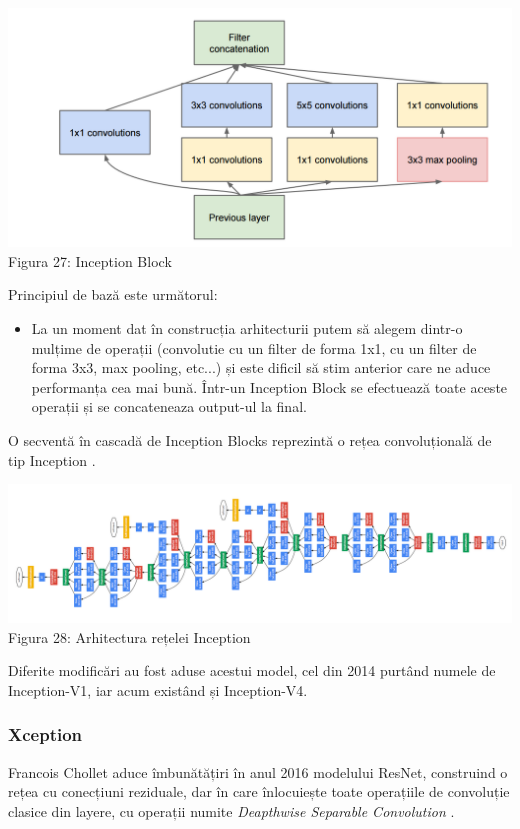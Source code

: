 \begin{center}
\includegraphics[scale=0.4]{inceptionBlock} \\
Figura 27: Inception Block
\end{center}

Principiul de bază este următorul:

\begin{itemize}
\item La un moment dat în construcția arhitecturii putem să alegem dintr-o mulțime de operații (convolutie cu un filter de forma 1x1, cu un filter de forma 3x3, max pooling, etc...) și este dificil să stim anterior care ne aduce performanța cea mai bună. Într-un Inception Block se efectuează toate aceste operații și se concateneaza output-ul la final.
\end{itemize} 

O secventă în cascadă de Inception Blocks reprezintă o rețea convoluțională de tip Inception \cite{inception}. 

\begin{center}
\includegraphics[scale=0.7]{inception} \\
Figura 28: Arhitectura rețelei Inception
\end{center}

Diferite modificări au fost aduse acestui model, cel din 2014 purtând numele de Inception-V1, iar acum existând și Inception-V4.

\subsubsection{Xception}
Francois Chollet aduce îmbunătățiri în anul 2016 modelului ResNet, construind o rețea cu conecțiuni reziduale, dar în care înlocuiește toate operațiile de convoluție clasice din layere, cu operații numite \textit{Deapthwise Separable Convolution} \cite{xception}. 

